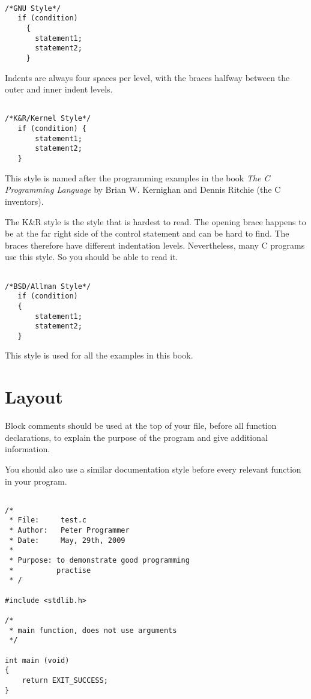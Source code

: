 \begin{verbatim}

/*GNU Style*/
   if (condition)
     {
       statement1;
       statement2;
     }
\end{verbatim}

Indents are always four spaces per level, with the braces halfway between the outer and inner indent levels.

\begin{verbatim}

/*K&R/Kernel Style*/
   if (condition) {
       statement1;
       statement2;
   }
\end{verbatim}

This style is named after the programming examples in the book
\emph{The C Programming Language} by Brian W. Kernighan and 
Dennis Ritchie (the C inventors). 

The K\&R style is the style that is hardest to read. 
The opening brace happens to be at the far right side of the control statement
and can be hard to find. The braces therefore have different indentation levels.
Nevertheless, many C programs use this style. So you should be able 
to read it.

\begin{verbatim}

/*BSD/Allman Style*/
   if (condition)
   {
       statement1;
       statement2;
   }
\end{verbatim}

This style is used for all the examples in this book.

\section{Layout}

Block comments should be used at the top of your file, before all
function declarations, to explain the purpose of the program and give additional
information.

You should also use a similar documentation style before every 
relevant function in your program.
\begin{verbatim}

/*
 * File:     test.c
 * Author:   Peter Programmer
 * Date:     May, 29th, 2009
 *
 * Purpose: to demonstrate good programming
 *          practise
 * /

#include <stdlib.h>

/*
 * main function, does not use arguments
 */

int main (void)
{
    return EXIT_SUCCESS;
}
 
\end{verbatim}



